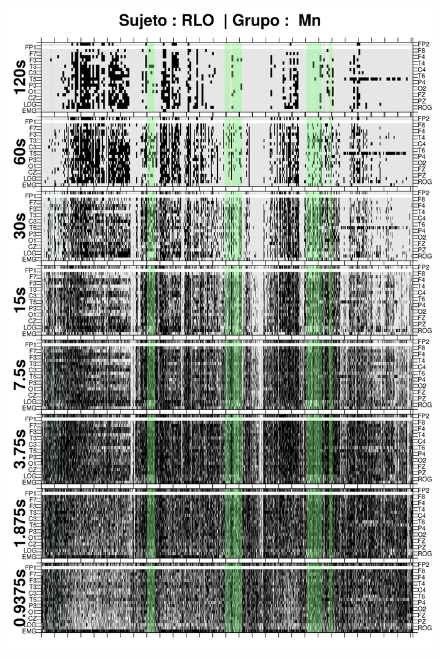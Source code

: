 
\begin{figure}
\centering
\includegraphics[width=0.9\linewidth]
{./img_ejemplos/RLMN10SUE_comp_est_.png} 
\end{figure}
